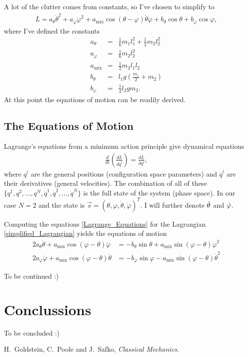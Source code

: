 \documentclass[a4paper]{article}
\begin{document}
	A lot of the clutter comes from constants, so I've chosen to simplify to
	\begin{eqnarray}\label{simplified_Lagrangian}
		L = a_{\theta}\dot{\theta}^2 + a_{\varphi}\dot{\varphi}^2 + a_{\mathrm{mix}}\cos( \theta - \varphi )\dot{\theta}\dot{\varphi} + b_{\theta}\cos{\theta} + b_{\varphi}\cos{\varphi},		
	\end{eqnarray}
	where I've defined the constants
	\begin{eqnarray}\label{a_th_def}
		a_{\theta} &=& \frac{1}{6}m_1 l_1^2 + \frac{1}{2}m_2 l_2^2 \\ \label{a_phi_def}
		a_{\varphi} &=& \frac{1}{6}m_2 l_2^2 \\ \label{a_mix_def}
		a_{\mathrm{mix}} &=& \frac{1}{2}m_2 l_1 l_2 \\ \label{b_th_def}
		b_{\theta} &=& l_1 g \left( \frac{m_1}{2} + m_2 \right) \\ \label{b_phi_def}
		b_{\varphi} &=& \frac{1}{2} l_2 g m_2.
	\end{eqnarray}
	At this point the equations of motion can be readily derived.
	
	\subsection{The Equations of Motion}\label{EoM_subsection}
	Lagrange's equations from a minimum action principle give dynamical equations
	\begin{eqnarray}\label{Lagrange_Equations}
		\frac{d}{dt}\left(\frac{d L}{d \dot{q}^i} \right) = \frac{dL}{dq^i},
	\end{eqnarray}
	where $q^i$ are the general positions (configuration space parameters) and $\dot{q}^i$ are their derivatives (general velocities).
	The combination of all of these $\{ q^1, q^2, ... , q^N, \dot{q}^1, \dot{q}^2, ... , \dot{q}^N \}$ is the full state of the system (phase space).
	In our case $N = 2$ and the state is $\vec{s} = ( \theta , \varphi , \dot{\theta} , \dot{\varphi} )^T$.
	I will further denote $\dot{\theta} \def \omega_{\theta}$ and $\dot{\varphi} \def \omega_{\varphi}$.
	
	Computing the equations \eqref{Lagrange_Equations} for the Lagrangian \eqref{simplified_Lagrangian} yields the equations of motion
	\begin{eqnarray}\label{eom_1}
		2 a_{\theta} \ddot{\theta} + a_{\mathrm{mix}}\cos( \varphi - \theta ) \ddot{\varphi} & = - b_{\theta}\sin{\theta} + a_{\mathrm{mix}}\sin( \varphi - \theta )\dot{\varphi}^2 \\ \label{eom_2}
		2 a_{\varphi} \ddot{\varphi} + a_{\mathrm{mix}}\cos( \varphi - \theta ) \ddot{\theta} & = - b_{\varphi}\sin{\varphi} - a_{\mathrm{mix}}\sin( \varphi - \theta )\dot{\theta}^2
	\end{eqnarray}

	To be continued :)
	
	\section{Conclussions}
	To be concluded :)

	\newpage
	\begin{thebibliography}{9}

	H.~Goldstein, C.~Poole and J.~Safko, \textit{Classical Mechanics}.

	\end{thebibliography}
\end{document}
